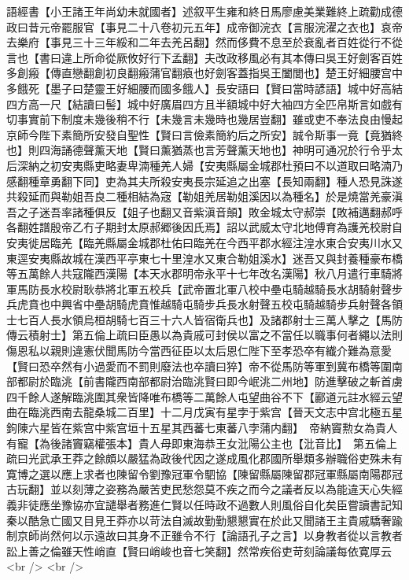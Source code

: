 語經書【小王諸王年尚幼未就國者】述叙平生雍和終日馬廖慮美業難終上疏勸成德政曰昔元帝罷服官【事見二十八卷初元五年】成帝御浣衣【言服浣濯之衣也】哀帝去樂府【事見三十三年綏和二年去羌呂翻】然而侈費不息至於衰亂者百姓從行不從言也【書曰違上所命從厥攸好行下孟翻】夫改政移風必有其本傳曰吳王好劍客百姓多創瘢【傳直戀翻創初良翻瘢蒲官翻㾗也好劍客蓋指吳王闔閭也】楚王好細腰宫中多餓死【墨子曰楚靈王好細腰而國多餓人】長安語曰【賢曰當時諺語】城中好高結四方高一尺【結讀曰髻】城中好廣眉四方且半額城中好大袖四方全匹帛斯言如戲有切事實前下制度未幾後稍不行【未幾言未幾時也幾居豈翻】雖或吏不奉法良由慢起京師今陛下素簡所安發自聖性【賢曰言儉素簡約后之所安】誠令斯事一竟【竟猶終也】則四海誦德聲薰天地【賢曰薰猶蒸也言芳聲薰天地也】神明可通况於行令乎太后深納之初安夷縣吏略妻卑湳種羌人婦【安夷縣屬金城郡杜預曰不以道取曰略湳乃感翻種章勇翻下同】吏為其夫所殺安夷長宗延追之出塞【長知兩翻】種人恐見誅遂共殺延而與勒姐吾良二種相結為宼【勒姐羌居勒姐溪因以為種名】於是燒當羌豪滇吾之子迷吾率諸種俱反【姐子也翻又音紫滇音顛】敗金城太守郝崇【敗補邁翻郝呼各翻姓譜殷帝乙冇子期封太原郝郷後因氏焉】詔以武威太守北地傅育為護羌校尉自安夷徙居臨羌【臨羌縣屬金城郡杜佑曰臨羌在今西平郡水經注湟水東合安夷川水又東逕安夷縣故城在漢西平亭東七十里湟水又東合勒姐溪水】迷吾又與封養種豪布橋等五萬餘人共寇隴西漢陽【本天水郡明帝永平十七年改名漢陽】秋八月遣行車騎將軍馬防長水校尉耿恭將北軍五校兵【武帝置北軍八校中壘屯騎越騎長水胡騎射聲步兵虎賁也中興省中壘胡騎虎賁惟越騎屯騎步兵長水射聲五校屯騎越騎步兵射聲各領士七百人長水領烏桓胡騎七百三十六人皆宿衛兵也】及諸郡射士三萬人擊之【馬防傳云積射士】第五倫上疏曰臣愚以為貴戚可封侯以富之不當任以職事何者繩以法則傷恩私以親則違憲伏聞馬防今當西征臣以太后恩仁陛下至孝恐卒有纎介難為意愛【賢曰恐卒然有小過愛而不罰則廢法也卒讀曰猝】帝不從馬防等軍到冀布橋等圍南部都尉於臨洮【前書隴西南部都尉治臨洮賢曰即今岷洮二州地】防進擊破之斬首虜四千餘人遂解臨洮圍其衆皆降唯布橋等二萬餘人屯望曲谷不下【酈道元註水經云望曲在臨洮西南去龍桑城二百里】十二月戊寅有星孛于紫宫【晉天文志中宫北極五星鉤陳六星皆在紫宫中紫宫垣十五星其西蕃七東蕃八孛蒲内翻】　帝納竇勲女為貴人有寵【為後諸竇竊權張本】貴人母即東海恭王女沘陽公主也【沘音比】　第五倫上疏曰光武承王莽之餘頗以嚴猛為政後代因之遂成風化郡國所舉類多辦職俗吏殊未有寛博之選以應上求者也陳留令劉豫冠軍令駟協【陳留縣屬陳留郡冠軍縣屬南陽郡冠古玩翻】並以刻薄之姿務為嚴苦吏民愁怨莫不疾之而今之議者反以為能違天心失經義非徒應坐豫協亦宜譴舉者務進仁賢以任時政不過數人則風俗自化矣臣嘗讀書記知秦以酷急亡國又目見王莽亦以苛法自滅故勤勤懇懇實在於此又聞諸王主貴戚驕奢踰制京師尚然何以示遠故曰其身不正雖令不行【論語孔子之言】以身教者從以言教者訟上善之倫雖天性峭直【賢曰峭峻也音七笑翻】然常疾俗吏苛刻論議每依寛厚云<br />
<br />
